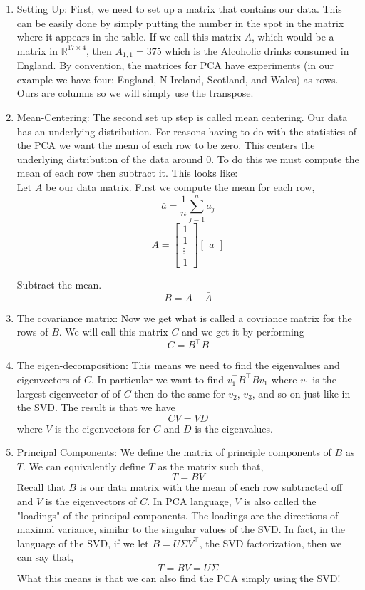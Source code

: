 \documentclass{article}
\begin{document}
\begin{enumerate}
\item Setting Up: First, we need to set up a matrix that contains our data. This can be easily done by simply putting the number in the spot in the matrix where it appears in the table. If we call this matrix $A$, which would be a matrix in $\mathbb{R}^{17\times 4}$, then $A_{1,1}=375$ which is the Alcoholic drinks consumed in England. By convention, the matrices for PCA have experiments (in our example we have four: England, N Ireland, Scotland, and Wales) as rows. Ours are columns so we will simply use the transpose.

\item Mean-Centering: The second set up step is called mean centering. Our data has an underlying distribution. For reasons having to do with the statistics of the PCA we want the mean of each row to be zero. This centers the underlying distribution of the data around 0. To do this we must compute the mean of each row then subtract it. This looks like:
$$~$$
Let $A$ be our data matrix. First we compute the mean for each row,
$$\bar{a}=\frac{1}{n}\sum_{j=1}^n a_j$$
$$\bar{A}=\begin{bmatrix}1\\1\\\vdots\\1\end{bmatrix}\left[~\,\bar{a}\,~\right]$$

Subtract the mean.
$$B=A-\bar{A}$$

\item The covariance matrix: Now we get what is called a covriance matrix for the rows of $B$. We will call this matrix $C$ and we get it by performing
$$C=B^\top B$$

\item The eigen-decomposition: This means we need to find the eigenvalues and eigenvectors of $C$. In particular we want to find $v_1^\top B^\top B v_1$ where $v_1$ is the largest eigenvector of of $C$ then do the same for $v_2$, $v_3$, and so on just like in the SVD. The result is that we have $$CV=VD$$ where $V$ is the eigenvectors for $C$ and $D$ is the eigenvalues.

\item Principal Components: We define the matrix of principle components of $B$ as $T$. We can equivalently define $T$ as the matrix such that,
$$T=BV$$
Recall that $B$ is our data matrix with the mean of each row subtracted off and $V$ is the eigenvectors of $C$. In PCA language, $V$ is also called the "loadings" of the principal components. The loadings are the directions of maximal variance, similar to the singular values of the SVD. In fact, in the language of the SVD, if we let $B=U\Sigma V^\top$, the SVD factorization, then we can say that,
$$T=BV=U\Sigma$$
What this means is that we can also find the PCA simply using the SVD!


\end{enumerate}
\end{document}
